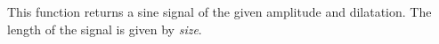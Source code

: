 This function returns a sine signal
of the given amplitude and dilatation. 
The length of the signal is given by {\em size}.





